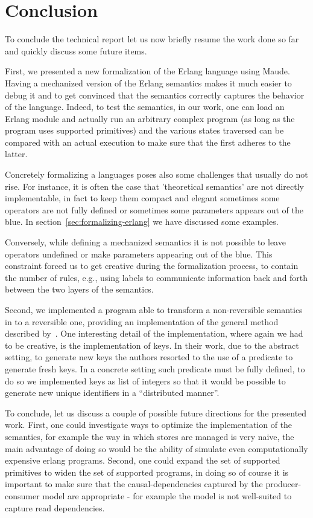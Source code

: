 \documentclass{article}[12pt,a4paper]
\theoremstyle{definition}
\begin{document}
\section{Conclusion}\label{sec:conclusion}
To conclude the technical report let us now briefly resume the work done so far
and quickly discuss some future items.

First, we presented a new formalization of the Erlang language using Maude.
Having a mechanized version of the Erlang semantics makes it much easier to
debug it and to get convinced that the semantics correctly captures the
behavior of the language. Indeed, to test the semantics, in our work, one can
load an Erlang module and actually run an arbitrary complex program (as long as
the program uses supported primitives) and the various states traversed can be
compared with an actual execution to make sure that the first adheres to the
latter.

Concretely formalizing a languages poses also some challenges that
usually do not rise. For instance, it is often the case that 'theoretical
semantics' are not directly implementable, in fact to keep them compact and
elegant sometimes some operators are not fully defined or sometimes some
parameters appears out of the blue. In section~\ref{sec:formalizing-erlang} we
have discussed some examples.

Conversely, while defining a mechanized semantics it is not possible to leave
operators undefined or make parameters appearing out of the blue. This
constraint forced us to get creative during the formalization process, to
contain the number of rules, e.g., using labels to communicate information back
and forth between the two layers of the semantics.

Second, we implemented a program able to transform a non-reversible semantics in to a
reversible one, providing an implementation of the general method described
by~\cite{LaneseM20}. One interesting detail of the implementation, where again we had to be
creative, is the implementation of keys. In their work, due to the abstract
setting, to generate new keys the authors resorted to the use of a predicate
to generate fresh keys. In a concrete setting such predicate must be fully
defined, to do so we implemented keys as list of integers so that it would be
possible to generate new unique identifiers in a ``distributed manner''.

To conclude, let us discuss a couple of possible future directions for the presented
work. First, one could investigate ways to optimize the implementation of the
semantics, for example the way in which stores are managed is very naive,
the main advantage of doing so would be the ability of simulate even
computationally expensive erlang
programs. Second, one could expand the set of supported primitives to widen the
set of supported programs, in doing so of course it is important to make sure
that the causal-dependencies captured by the producer-consumer model are
appropriate - for example the model is not well-suited to capture read
dependencies.


  





\end{document}
